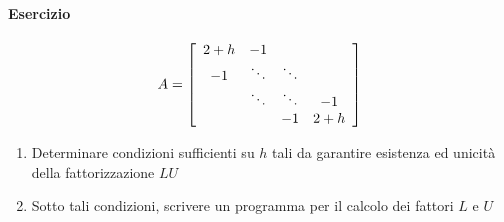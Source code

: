 \documentclass[10pt]{book}
\begin{document}
\paragraph{Esercizio}
\begin{multicols}{2}
\begin{center}
	$$A = \left[\begin{array}{c c c c}
	2 + h & -1\\
	-1 & \ddots & \ddots\\
	& \ddots & \ddots & -1\\
	& & -1 & 2+h
\end{array}\right]$$
\end{center}
\columnbreak
\begin{enumerate}
	\item Determinare condizioni sufficienti su $h$ tali da garantire esistenza ed unicità della fattorizzazione $LU$
	\item Sotto tali condizioni, scrivere un programma per il calcolo dei fattori $L$ e $U$
\end{enumerate}
\end{multicols}
\end{document}
